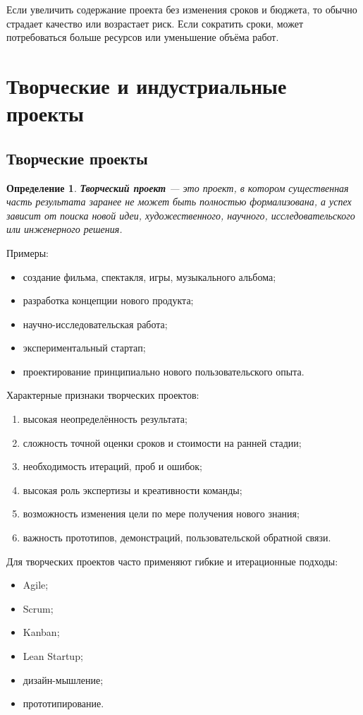 \documentclass[12pt,a4paper]{article}
\newtheorem{definition}{Определение}
\begin{document}
Если увеличить содержание проекта без изменения сроков и бюджета, то обычно страдает качество или возрастает риск. Если сократить сроки, может потребоваться больше ресурсов или уменьшение объёма работ.

\section{Творческие и индустриальные проекты}

\subsection{Творческие проекты}

\begin{definition}
\textbf{Творческий проект} --- это проект, в котором существенная часть результата заранее не может быть полностью формализована, а успех зависит от поиска новой идеи, художественного, научного, исследовательского или инженерного решения.
\end{definition}

Примеры:
\begin{itemize}
    \item создание фильма, спектакля, игры, музыкального альбома;
    \item разработка концепции нового продукта;
    \item научно-исследовательская работа;
    \item экспериментальный стартап;
    \item проектирование принципиально нового пользовательского опыта.
\end{itemize}

Характерные признаки творческих проектов:
\begin{enumerate}
    \item высокая неопределённость результата;
    \item сложность точной оценки сроков и стоимости на ранней стадии;
    \item необходимость итераций, проб и ошибок;
    \item высокая роль экспертизы и креативности команды;
    \item возможность изменения цели по мере получения нового знания;
    \item важность прототипов, демонстраций, пользовательской обратной связи.
\end{enumerate}

Для творческих проектов часто применяют гибкие и итерационные подходы:
\begin{itemize}
    \item Agile;
    \item Scrum;
    \item Kanban;
    \item Lean Startup;
    \item дизайн-мышление;
    \item прототипирование.
\end{itemize}
\end{document}
